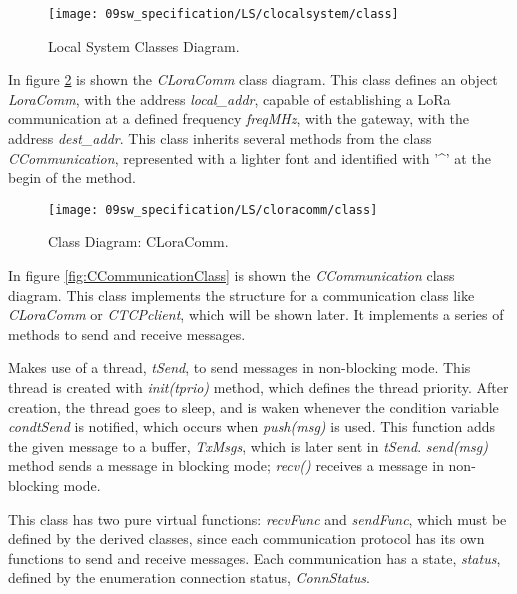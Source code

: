 \begin{figure}[H]
	\centering
	\texttt{[image: 09sw\_specification/LS/clocalsystem/class]}
	\caption{Local System Classes Diagram.}
	\label{fig:classDiag}
\end{figure}

\clearpage
{}

In figure \ref{fig:LoraCommClass} is shown the \textit{CLoraComm} class diagram. This class defines an object \textit{LoraComm}, with the address \textit{local\_addr}, capable of establishing a LoRa communication at a defined frequency \textit{freqMHz}, with the gateway, with the address \textit{dest\_addr}. This class inherits several methods from the class \textit{CCommunication}, represented with a lighter font and identified with '\^{}' at the begin of the method.

\begin{figure}[H]
	\centering
	\texttt{[image: 09sw\_specification/LS/cloracomm/class]}
	\caption{Class Diagram: CLoraComm.}
	\label{fig:LoraCommClass}
\end{figure}

\clearpage
{}

In figure \ref{fig:CCommunicationClass} is shown the \textit{CCommunication} class diagram. This class implements the structure for a communication class like \textit{CLoraComm} or \textit{CTCPclient}, which will be shown later. It implements a series of methods to send and receive messages. 

Makes use of a thread, \textit{tSend}, to send messages in non-blocking mode. This thread is created with \textit{init(tprio)} method, which defines the thread priority. After creation, the thread goes to sleep, and is waken whenever the condition variable \textit{condtSend} is notified, which occurs when \textit{push(msg)} is used. This function adds the given message to a buffer, \textit{TxMsgs}, which is later sent in \textit{tSend}. \textit{send(msg)} method sends a message in blocking mode; \textit{recv()} receives a message in non-blocking mode. %

This class has two pure virtual functions: \textit{recvFunc} and \textit{sendFunc}, which must be defined by the derived classes, since each communication protocol has its own functions to send and receive messages. Each communication has a state, \textit{status}, defined by the enumeration connection status, \textit{ConnStatus}.

